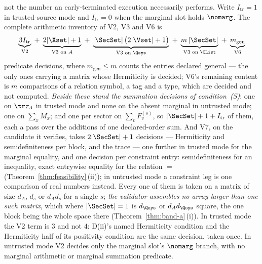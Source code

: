 \begin{theorem}
\begin{enumerate}[label=(\roman*),leftmargin=2.2em]
not the number an early-terminated execution necessarily performs.
Write $I_{\mathrm{tr}}=1$ in trusted-source mode and $I_{\mathrm{tr}}=0$ when
the marginal slot holds $\nomarg$. The complete arithmetic inventory of V2,
V3 and V6 is
\begin{equation}\label{eq:predcount}
  \underbrace{3I_{\mathrm{tr}}}_{\text{V2}}
  \;+\;\underbrace{2|\Xset|+1}_{\text{V3 on }A}
  \;+\;\underbrace{|\SecSet|\,\big(2|\Vset|+1\big)}_{\text{V3 on }\Qsys}
  \;+\;\underbrace{m\,|\SecSet|}_{\text{V3 on }\CList}
  \;+\;\underbrace{m_{\text{gen}}}_{\text{V6}}
\end{equation}
predicate decisions, where $m_{\text{gen}}\le m$ counts the entries declared
general --- the only ones carrying a matrix whose Hermiticity is
decided; V6's remaining content is $m$ comparisons of a relation symbol, a tag
and a type, which are decided and not computed. \emph{Beside these stand the
summation decisions of condition~(S)}: one on $\tr\tau_A$ in trusted
mode and none on the absent marginal in untrusted mode; one on
$\sum_xM_x$; and one per sector on $\sum_vF_v^{(s)}$, so
$|\SecSet|+1+I_{\mathrm{tr}}$ of them,
each a pass over the additions of one declared-order sum. And V7, on the
candidate it verifies, takes $2|\SecSet|+1$ decisions --- Hermiticity and
semidefiniteness per block, and the trace --- one further in trusted mode for
the marginal equality, and one decision per constraint entry: semidefiniteness
for an inequality, exact entrywise equality for the relation $=$
(Theorem~\ref{thm:feasibility}\,(ii)); in untrusted mode a constraint leg is one
comparison of real numbers instead. Every one of them is taken on a matrix of
size $d_A$, $d_s$ or $d_Ad_s$ for a single $s$; \emph{the validator
assembles no array larger than one such matrix}, which where $|\SecSet|=1$ is
$d_{\Qsys}$ or $d_Ad_{\Qsys}$ square, the one block being the whole space
there (Theorem~\ref{thm:band-a}\,(i)).
In trusted mode the V2 term is $3$ and not $4$: D(ii)'s named Hermiticity
condition and the Hermiticity half of its positivity condition are the same
decision, taken once. In untrusted mode V2 decides only the marginal slot's
$\nomarg$ branch, with no marginal arithmetic or marginal summation predicate.
\end{enumerate}


\end{theorem}
